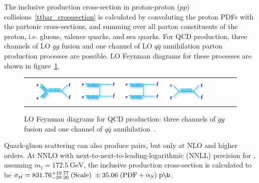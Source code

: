 The inclusive \ttbar production cross-section in proton-proton ($pp$) collisions~\ref{ttbar_crosssection} is calculated by convoluting the proton PDFs with the partonic cross-sections, and summing over all parton constituents of the proton, i.e. gluons, valence quarks, and sea quarks.
For QCD \ttbar production, three channels of LO $gg$ fusion and one channel of LO $q\bar{q}$ annihilation parton production processes are possible.
LO Feynman diagrams for these processes are shown in figure~\ref{ttbar_production_LO_feynman_diagrams}.
\begin{figure}[!htb]
  \begin{center}
    \begin{tabular}{cccc}
        \includegraphics[width=0.225\textwidth]{fig_TopQuark/feynman_ttbar_LHC_gggtt.png}
        \includegraphics[width=0.225\textwidth]{fig_TopQuark/feynman_ttbar_LHC_ggttt.png}
        \includegraphics[width=0.225\textwidth]{fig_TopQuark/feynman_ttbar_LHC_ggttbart.png}
        \includegraphics[width=0.225\textwidth]{fig_TopQuark/feynman_ttbar_LHC_qqgtt.png}
    \end{tabular}
    \caption{LO Feynman diagrams for QCD \ttbar production: three channels of $gg$ fusion and one channel of $q\bar{q}$ annihilation~\cite{d0_diagrams}.
            }
    \label{ttbar_production_LO_feynman_diagrams}
  \end{center}
\end{figure}
Quark-gluon scattering can also produce \ttbar pairs, but only at NLO and higher orders.
At NNLO with next-to-next-to-leading-logarithmic (NNLL) precision for \beamenergy, assuming $m_t = \SI{172.5}{\GeV}$, the inclusive \ttbar production cross-section is calculated to be $\sigma_{\ttbar} = 831.76 \substack{+19.77 \\ -29.20} \; (\text{Scale}) \; \pm 35.06 \; (\text{PDF} + \alpha_S) \; \si{\pico \b}$.
